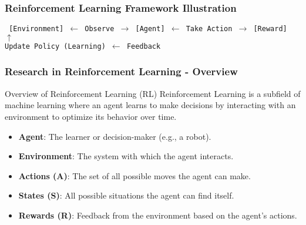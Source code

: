 \documentclass[aspectratio=169]{beamer}
\begin{document}
\begin{frame}[fragile]
    \frametitle{Reinforcement Learning Framework Illustration}
    \begin{center}
        \texttt{
        [Environment] $\leftarrow$ Observe $\rightarrow$ [Agent] $\leftarrow$ Take Action $\rightarrow$ [Reward] \\
                     $\uparrow$ \\
          Update Policy (Learning) $\leftarrow$ Feedback
        }
    \end{center}
\end{frame}

\begin{frame}[fragile]
    \frametitle{Research in Reinforcement Learning - Overview}
    \begin{block}{Overview of Reinforcement Learning (RL)}
        Reinforcement Learning is a subfield of machine learning where an agent learns to make decisions by interacting with an environment to optimize its behavior over time.
    \end{block}
    
    \begin{itemize}
        \item \textbf{Agent}: The learner or decision-maker (e.g., a robot).
        \item \textbf{Environment}: The system with which the agent interacts.
        \item \textbf{Actions (A)}: The set of all possible moves the agent can make.
        \item \textbf{States (S)}: All possible situations the agent can find itself.
        \item \textbf{Rewards (R)}: Feedback from the environment based on the agent’s actions.
    \end{itemize}
\end{frame}
\end{document}

